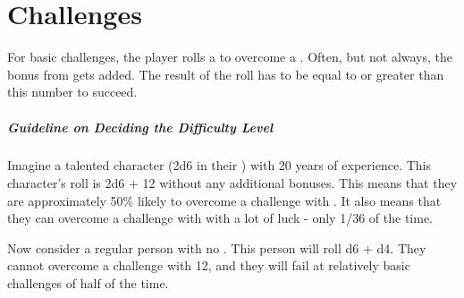 \documentclass{LegrandOrangeTufteBook}
\begin{document}
\chapterspaceabove{6.75cm}
\chapterspacebelow{11.25cm}


\chapter*{Challenges}

\begin{emphasisParagraph}
	For basic challenges, the player rolls a  to overcome a .
	Often, but not always, the bonus from  gets added.
	The result of the roll has to be equal to or greater than this number to succeed.
\end{emphasisParagraph}

\paragraph*{Guideline on Deciding the Difficulty Level}

Imagine a talented character (2d6 in their ) with 20 years of experience.
This character's roll is 2d6 + 12 without any additional bonuses.
This means that they are approximately 50\% likely to overcome a challenge with .
It also means that they can overcome a challenge with  with a lot of luck - only 1/36 of the time.\\

\marginpar{
	\footnotesize
	
}

Now consider a regular person with no . This person will roll d6 + d4.
They cannot overcome a challenge with 12,
and they will fail at relatively basic challenges of  half of the time.\\
\end{document}
